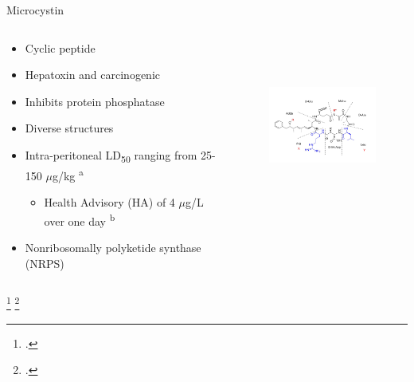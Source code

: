 \begin{frame}{Microcystin}

\begin{columns}
	\begin{column}{0.5\textwidth}

	\begin{itemize}
		\item Cyclic peptide
		\item Hepatoxin and carcinogenic
		\item Inhibits protein phosphatase
		\item Diverse structures 
		\item Intra-peritoneal LD\textsubscript{50} ranging from 25-150 $\mu$g/kg  \textsuperscript{a}
			\begin{itemize}
				\item Health Advisory (HA) of 4 $\mu$g/L over one day \textsuperscript{b}
			\end{itemize}
		\item Nonribosomally polyketide synthase (NRPS)
	\end{itemize}
	\end{column}
	\begin{column}{0.3\textwidth}
\begin{figure}[ht]
	\centering
	\hspace*{-1cm}
	\includegraphics[width=2in, height=2.2in]{../figures/Microcystin-LR.png}
\end{figure}
	\end{column}
\end{columns}
\footcitetext{[a], dittmann_cyanobacterial_2012}
\footcitetext{[b], usepa_draft_2016}
\end{frame}
